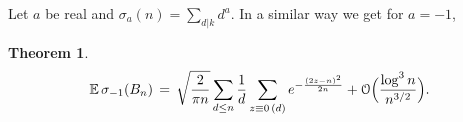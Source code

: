 \documentclass[11pt,draft,reqno]{amsart}
\newtheorem{theorem}{Theorem}[section]
\theoremstyle{definition}
\theoremstyle{remarks}
\numberwithin{equation}{section}
\def \D{{\Delta}}
\def \d{{\delta}}
\def \m{{\mu}}
\def \s{{\sigma}}
\def\P{{\mathcal P}}
\def\E{{\mathbb E \,}}
\def\P{{\mathbb P}}
\begin{document}

 
 
 

  Let $a$ be real and  $\s_{a}(n)= \sum_{d|k} d^a  $.  In a similar way we get for $a=-1$,%
  \begin{theorem}\label{sigma-1.Bn}
\begin{equation*}\E \s_{-1}( B_n) \,=\,   \sqrt{  { 2\over \pi
n}} \sum_{d\le n}  \frac1d \sum_{ 
z\equiv 0\, (d)} e^{-{ (2z-n)^2\over 2 n}} 
+ {\mathcal O}\Big({ \log^{3} n   \over n^{3/2}}\Big) .\end{equation*} 
\end{theorem}
\end{document}
